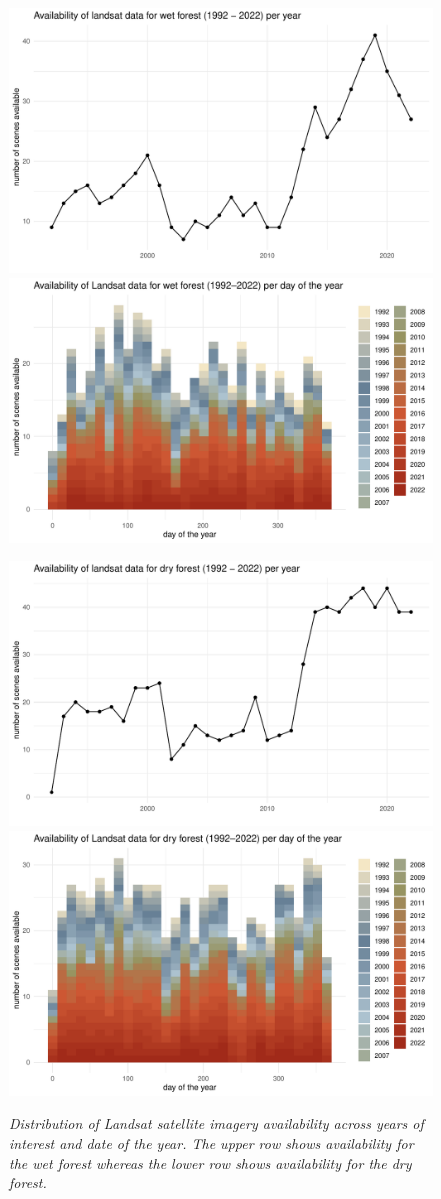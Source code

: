 \begin{figure}[h]
\centering

\includegraphics[width=0.48\linewidth, keepaspectratio]{Report/figures/wf_sd1.pdf}
\hspace{0.02\linewidth}
\includegraphics[width=0.48\linewidth, keepaspectratio]{Report/figures/wf_sd2.pdf}

\vspace{1cm} %

\includegraphics[width=0.48\linewidth, keepaspectratio]{Report/figures/df_sd1.pdf}
\hspace{0.02\linewidth}
\includegraphics[width=0.48\linewidth, keepaspectratio]{Report/figures/df_sd2.pdf}

\caption{\textit{Distribution of Landsat satellite imagery availability across years of interest and date of the year. The upper row shows availability for the wet forest whereas the lower row shows availability for the dry forest.}}
\label{fig:satellite}
\end{figure}


